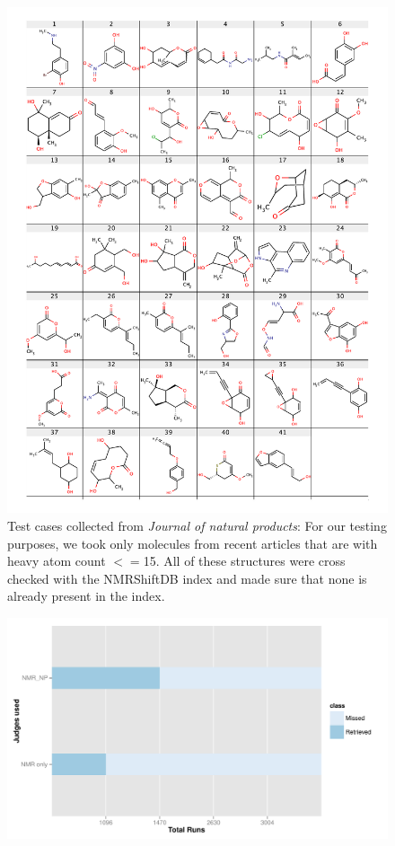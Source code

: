 \documentclass[10pt]{bmc_article}
\newenvironment{bmcformat}{\begin{raggedright}\baselineskip20pt\sloppy\setboolean{publ}{false}}{\end{raggedright}\baselineskip20pt\sloppy}
\begin{document}
\begin{bmcformat}
\begin{figure}[hbt]
  \label{fig:EAprocedure}
\end{figure}

\begin{figure}[hbt]
  \centering
  	\includegraphics[angle=0,clip=false,scale=0.5]{pics/testcases.pdf}
	
  \caption{Test cases collected from \emph{Journal of natural products}: For our testing purposes, we took only molecules from recent articles that are with heavy atom count $<=$15. All of these structures were cross checked with the NMRShiftDB index and made sure that none is  already present in the index.}
   
  \label{fig:testcases}
\end{figure}

\begin{figure}[hbt]
  \centering
  	\includegraphics[angle=0,clip=false,scale=0.5]{pics/retrieval.pdf}
	

\end{figure}
\end{bmcformat}
\end{document}

